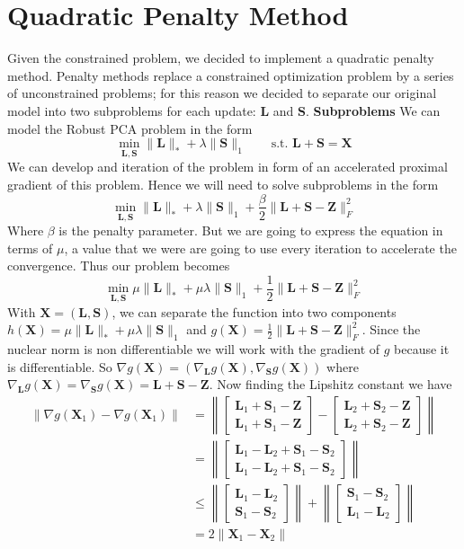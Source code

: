 \documentclass[12pt]{article}
\newcommand{\vL}{{\mathbf{L}}}
\newcommand{\vS}{{\mathbf{S}}}
\newcommand{\vX}{{\mathbf{X}}}
\newcommand{\vZ}{{\mathbf{Z}}}
\begin{document}
\section*{Quadratic Penalty Method}
Given the constrained problem, we decided to implement a quadratic penalty method. Penalty methods replace a constrained optimization problem by a series of unconstrained problems; for this reason we decided to separate our original model into two subproblems for each update: $\vL$ and $\vS$.
\noindent
\newline
\textbf{Subproblems}
\newline
\noindent We can model the Robust PCA problem in the form
$$\min_{\vL, \vS}\|\vL\|_* + \lambda \|\vS\|_1 \qquad \text{s.t. }\vL + \vS = \vX$$
We can develop and iteration of the problem in form of an accelerated proximal gradient of this problem. Hence we will need to solve subproblems in the form
$$\min_{\vL, \vS}\|\vL\|_* + \lambda \|\vS\|_1  + \frac{\beta}{2}\|\vL + \vS - \vZ\|^2_F$$
Where $\beta$ is the penalty parameter. But we are going to express the equation in terms of $\mu$, a value that we were are going to use every iteration to accelerate the convergence. Thus our problem becomes
$$\min_{\vL, \vS}\mu\|\vL\|_* + \mu\lambda \|\vS\|_1  + \frac{1}{2}\|\vL + \vS - \vZ\|^2_F$$
With $\vX = (\vL, \vS)$, we can separate the function into two components $h(\vX) = \mu\|\vL\|_* + \mu\lambda \|\vS\|_1$ and $g(\vX) = \frac{1}{2}\|\vL + \vS - \vZ\|^2_F$. Since the nuclear norm is non differentiable we will work with the gradient of $g$ because it is differentiable. So $\nabla g(\vX) = (\nabla_\vL g(\vX), \nabla_\vS g(\vX))$ where $\nabla_\vL g(\vX) = \nabla_\vS g(\vX) = \vL + \vS - \vZ$.
Now finding the Lipshitz constant we have 
\begin{align*}
    \|\nabla g(\vX_1) - \nabla g(\vX_1) \| &= \left\|\begin{bmatrix}\vL_1 + \vS_1 - \vZ\\ \vL_1 + \vS_1 - \vZ\end{bmatrix} - \begin{bmatrix}\vL_2 + \vS_2 - \vZ\\ \vL_2 + \vS_2 - \vZ\end{bmatrix}\right\| \\
    &= \left\|\begin{bmatrix}\vL_1 - \vL_2 + \vS_1 - \vS_2\\ \vL_1 - \vL_2 + \vS_1 - \vS_2\end{bmatrix} \right\|\\
    &\leq \left\| \begin{bmatrix}\vL_1 - \vL_2\\\vS_1 - \vS_2 \end{bmatrix}\right\| + \left\| \begin{bmatrix}\vS_1 - \vS_2\\\vL_1 - \vL_2 \end{bmatrix}\right\|\\
    &= 2\|\vX_1 - \vX_2 \|
\end{align*}
\end{document}

